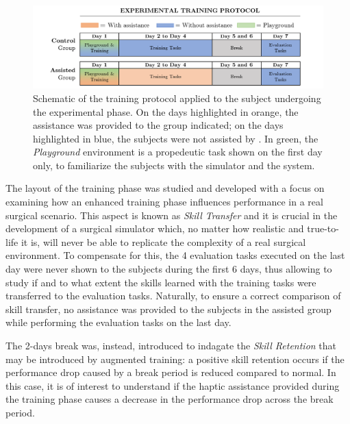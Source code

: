 \documentclass[../main.tex]{subfiles}
\begin{document}
\begin{figure}
    \centering
    \includegraphics[width=\textwidth]{images/training_protocol.png}
    \caption{Schematic of the training protocol applied to the subject undergoing the experimental phase. On the days highlighted in orange, the \vf assistance was provided to the group indicated; on the days highlighted in blue, the subjects were not assisted by \vfs. In green, the \textit{Playground} environment is a propedeutic task shown on the first day only, to familiarize the subjects with the simulator and the \davinci system.}
    \label{fig:trainingprotocol}
\end{figure}

The layout of the training phase was studied and developed with a focus on examining how an enhanced training phase influences performance in a real surgical scenario. This aspect is known as \textit{Skill Transfer} and it is crucial in the development of a surgical simulator which, no matter how realistic and true-to-life it is, will never be able to replicate the complexity of a real surgical environment. To compensate for this, the 4 evaluation tasks executed on the last day were never shown to the subjects during the first 6 days, thus allowing to study if and to what extent the skills learned with the training tasks were transferred to the evaluation tasks. Naturally, to ensure a correct comparison of skill transfer, no assistance was provided to the subjects in the assisted group while performing the evaluation tasks on the last day.

The 2-days break was, instead, introduced to indagate the \textit{Skill Retention} that may be introduced by augmented training: a positive skill retention occurs if the performance drop caused by a break period is reduced compared to normal. In this case, it is of interest to understand if the haptic assistance provided during the training phase causes a decrease in the performance drop across the break period.
\end{document}
